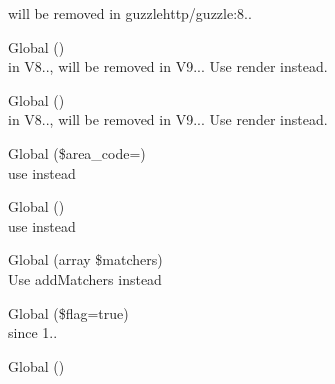 \begin{DoxyRefList}
\label{deprecated__deprecated000081}%
%
 will be removed in guzzlehttp/guzzle\+:8..  
\item[Global \doxylink{class_sabberworm_1_1_c_s_s_1_1_value_1_1_color_a7516ca30af0db3cdbf9a7739b48ce91d}{Color\+::\+\_\+\+\_\+to\+String} ()]\hfill \\
\label{deprecated__deprecated000422}%
%
in V8.., will be removed in V9... Use {\ttfamily render} instead.  
\item[Global \doxylink{class_sabberworm_1_1_c_s_s_1_1_comment_1_1_comment_a7516ca30af0db3cdbf9a7739b48ce91d}{Comment\+::\+\_\+\+\_\+to\+String} ()]\hfill \\
\label{deprecated__deprecated000380}%
%
in V8.., will be removed in V9... Use {\ttfamily render} instead.  
\item[Global \doxylink{class_faker_1_1_provider_1_1ru___r_u_1_1_company_a40dd75d5fb310726e9a83185ce475f99}{Company\+::inn} (\$area\+\_\+code=\textquotesingle{}\textquotesingle{})]\hfill \\
\label{deprecated__deprecated000069}%
%
use {\ttfamily \doxylink{}{()}} instead  
\item[Global \doxylink{class_faker_1_1_provider_1_1it___i_t_1_1_company_aef7aa0b8af596891f43c20b54b1e6dbf}{Company\+::vat\+Id} ()]\hfill \\
\label{deprecated__deprecated000068}%
%
use {\ttfamily \doxylink{}{()}} instead  
\item[Global \doxylink{class_psy_1_1_configuration_ac3ea07db68f7969d52cd9d07cfc6270d}{Configuration\+::add\+Tab\+Completion\+Matchers} (array \$matchers)]\hfill \\
\label{deprecated__deprecated000331}%
%
Use {\ttfamily add\+Matchers} instead 
\item[Global \doxylink{class_mockery_1_1_configuration_a8b6e91b795213f2fe009d43ef8c588a2}{Configuration\+::allow\+Mocking\+Methods\+Unnecessarily} (\$flag=true)]\hfill \\
\label{deprecated__deprecated000165}%
%
since 1..  
\item[Global \doxylink{class_psy_1_1_configuration_a8ead8314d1ed164023948b9e2c48fee3}{Configuration\+::get\+Tab\+Completion} ()]\hfill \\

\end{DoxyRefList}
